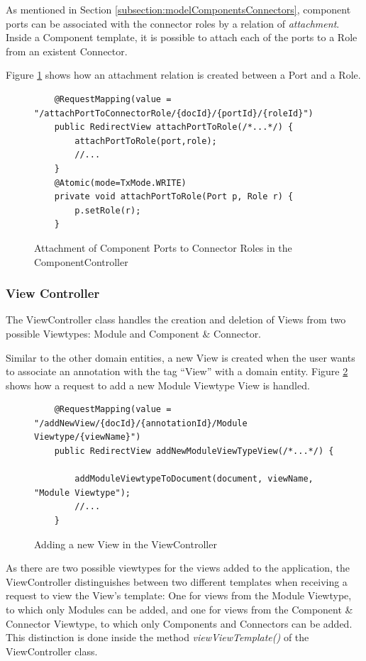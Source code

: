 \documentclass{llncs}
\begin{document}
As mentioned in Section \ref{subsection:modelComponentsConnectors}, component ports can be associated with the connector roles by a relation of \textit{attachment}. Inside a Component template, it is possible to attach each of the ports to a Role from an existent Connector.

Figure \ref{figure:ComponentControllerAttachment} shows how an attachment relation is created between a Port and a Role.

\begin{figure}
\lstset{style=customjava}
\begin{lstlisting}
	@RequestMapping(value = "/attachPortToConnectorRole/{docId}/{portId}/{roleId}")
	public RedirectView attachPortToRole(/*...*/) {
		attachPortToRole(port,role);
		//...
	}
	@Atomic(mode=TxMode.WRITE)
	private void attachPortToRole(Port p, Role r) {
		p.setRole(r);
	}
\end{lstlisting}
\caption{Attachment of Component Ports to Connector Roles in the ComponentController}
\label{figure:ComponentControllerAttachment}
\end{figure}

\subsubsection{View Controller}
\label{substection:viewController}

The ViewController class handles the creation and deletion of Views from two possible Viewtypes: Module and Component \& Connector. 

Similar to the other domain entities, a new View is created when the user wants to associate an annotation with the tag ``View'' with a domain entity. Figure \ref{figure:ViewControllerAddModuleViewtype} shows how a request to add a new Module Viewtype View is handled.

\begin{figure}
\lstset{style=customjava}
\begin{lstlisting}
	@RequestMapping(value = "/addNewView/{docId}/{annotationId}/Module Viewtype/{viewName}")
	public RedirectView addNewModuleViewTypeView(/*...*/) {
	
		addModuleViewtypeToDocument(document, viewName, "Module Viewtype");
		//...
	}
\end{lstlisting}
\caption{Adding a new View in the ViewController}
\label{figure:ViewControllerAddModuleViewtype}
\end{figure}

As there are two possible viewtypes for the views added to the application, the ViewController distinguishes between two different templates when receiving a request to view the View's template: One for views from the Module Viewtype, to which only Modules can be added, and one for views from the Component \& Connector Viewtype, to which only Components and Connectors can be added. This distinction is done inside the method \textit{viewViewTemplate()} of the ViewController class. 
\end{document}

